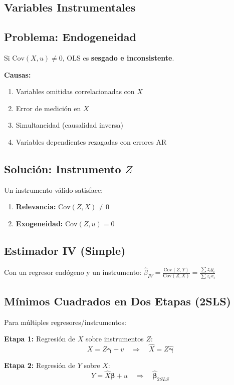 \documentclass[9pt, spanish, twoside]{article}
\newcommand{\critical}[1]{\textcolor{CriticalRed}{\textbf{#1}}}
\newcommand{\eqbox}[1]{\colorbox{TitaniumGray}{$\displaystyle #1$}}
\begin{document}
\begin{multicols*}{3}
\section{Variables Instrumentales}
\subsection{Problema: Endogeneidad}
Si $\text{Cov}(X, u) \neq 0$, OLS es \critical{sesgado e inconsistente}.

\textbf{Causas:}
\begin{enumerate}[leftmargin=8pt, noitemsep, topsep=2pt]
    \item Variables omitidas correlacionadas con $X$
    \item Error de medición en $X$
    \item Simultaneidad (causalidad inversa)
    \item Variables dependientes rezagadas con errores AR
\end{enumerate}

\subsection{Solución: Instrumento $Z$}
Un instrumento válido satisface:
\begin{enumerate}[leftmargin=8pt, noitemsep, topsep=2pt]
    \item \textbf{Relevancia:} $\text{Cov}(Z, X) \neq 0$
    \item \textbf{Exogeneidad:} $\text{Cov}(Z, u) = 0$
\end{enumerate}

\subsection{Estimador IV (Simple)}
Con un regresor endógeno y un instrumento:
\eqbox{\hat{\beta}_{IV} = \frac{\text{Cov}(Z, Y)}{\text{Cov}(Z, X)} = \frac{\sum z_i y_i}{\sum z_i x_i}}

\subsection{Mínimos Cuadrados en Dos Etapas (2SLS)}
Para múltiples regresores/instrumentos:

\textbf{Etapa 1:} Regresión de $X$ sobre instrumentos $Z$:
$$X = Z\boldsymbol{\gamma} + v \quad \Rightarrow \quad \hat{X} = Z\hat{\boldsymbol{\gamma}}$$

\textbf{Etapa 2:} Regresión de $Y$ sobre $\hat{X}$:
$$Y = \hat{X}\boldsymbol{\beta} + u \quad \Rightarrow \quad \hat{\boldsymbol{\beta}}_{2SLS}$$


\end{multicols*}
\end{document}
